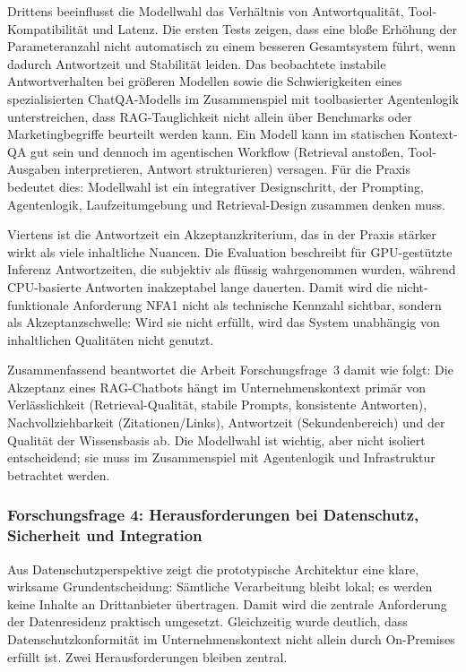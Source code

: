 Drittens beeinflusst die Modellwahl das Verhältnis von Antwortqualität, Tool-Kompatibilität und Latenz.
Die ersten Tests zeigen, dass eine bloße Erhöhung der Parameteranzahl nicht automatisch zu einem besseren Gesamtsystem führt, wenn dadurch Antwortzeit und Stabilität leiden.
Das beobachtete instabile Antwortverhalten bei größeren Modellen sowie die Schwierigkeiten eines spezialisierten ChatQA-Modells im Zusammenspiel mit toolbasierter Agentenlogik unterstreichen, dass \glqq RAG-Tauglichkeit\grqq{} nicht allein über Benchmarks oder Marketingbegriffe beurteilt werden kann.
Ein Modell kann im statischen Kontext-QA gut sein und dennoch im agentischen Workflow (Retrieval anstoßen, Tool-Ausgaben interpretieren, Antwort strukturieren) versagen.
Für die Praxis bedeutet dies: Modellwahl ist ein integrativer Designschritt, der Prompting, Agentenlogik, Laufzeitumgebung und Retrieval-Design zusammen denken muss.

Viertens ist die Antwortzeit ein Akzeptanzkriterium, das in der Praxis stärker wirkt als viele inhaltliche Nuancen.
Die Evaluation beschreibt für GPU-gestützte Inferenz Antwortzeiten, die subjektiv als flüssig wahrgenommen wurden, während CPU-basierte Antworten inakzeptabel lange dauerten.
Damit wird die nicht-funktionale Anforderung NFA1 nicht als \glqq technische Kennzahl\grqq{} sichtbar, sondern als Akzeptanzschwelle: Wird sie nicht erfüllt, wird das System unabhängig von inhaltlichen Qualitäten nicht genutzt.

Zusammenfassend beantwortet die Arbeit Forschungsfrage~3 damit wie folgt:
Die Akzeptanz eines RAG-Chatbots hängt im Unternehmenskontext primär von Verlässlichkeit (Retrieval-Qualität, stabile Prompts, konsistente Antworten), Nachvollziehbarkeit (Zitationen/Links), Antwortzeit (Sekundenbereich) und der Qualität der Wissensbasis ab.
Die Modellwahl ist wichtig, aber nicht isoliert entscheidend; sie muss im Zusammenspiel mit Agentenlogik und Infrastruktur betrachtet werden.

\subsubsection{Forschungsfrage 4: Herausforderungen bei Datenschutz, Sicherheit und Integration}

Aus Datenschutzperspektive zeigt die prototypische Architektur eine klare, wirksame Grundentscheidung:
Sämtliche Verarbeitung bleibt lokal; es werden keine Inhalte an Drittanbieter übertragen.
Damit wird die zentrale Anforderung der Datenresidenz praktisch umgesetzt.
Gleichzeitig wurde deutlich, dass Datenschutzkonformität im Unternehmenskontext nicht allein durch \glqq On-Premises\grqq{} erfüllt ist.
Zwei Herausforderungen bleiben zentral.

